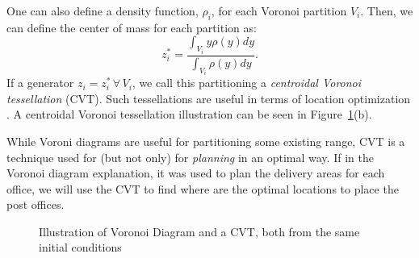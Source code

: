 \documentclass{iacas}
\begin{document}
One can also define a density function, $\rho_i$, for each Voronoi partition $V_{i}$. Then, we can define the center of mass for each partition as:
\begin{equation}
z_{i}^{*} = \frac{\int_{V_{i}}y\rho(y)dy}{\int_{V_{i}}\rho(y)dy}.
\end{equation}
If a generator $z_{i} = z_{i}^{*} \, \forall \,V_{i}$, we call this partitioning a \emph{centroidal Voronoi tessellation} (CVT). Such tessellations are useful in terms of location optimization \cite{Cortes2004,Du1999,Atinc2013}.
A centroidal Voronoi tessellation illustration can be seen in Figure~\ref{fig:Voronoi_tessellation_illustration}(b). 

While Voroni diagrams are useful for partitioning some existing range, CVT is a technique used for (but not only) for \textit{planning} in an optimal way. If in the Voronoi diagram explanation, it was used to plan the delivery areas for each office, we will use the CVT to find where are the optimal locations to place the post offices.

\begin{figure}
	\captionsetup[subfigure]{position=b}
	\centering
	\label{fig:voronoi:voronoi}
	\caption{Illustration of Voronoi Diagram and a CVT, both from the same initial conditions}
\label{fig:Voronoi_tessellation_illustration}
\end{figure}
\end{document}
